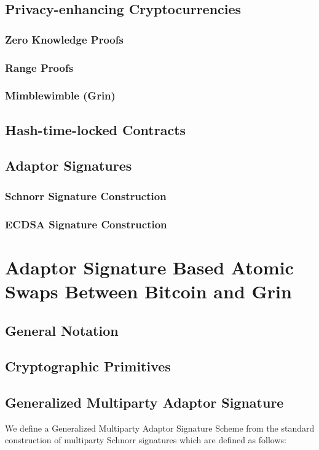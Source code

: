 \documentclass[draft,final]{vutinfth} %
\begin{document}
\section{Privacy-enhancing Cryptocurrencies}
\subsection{Zero Knowledge Proofs}
\subsection{Range Proofs}
\subsection{Mimblewimble (Grin)}
\section{Hash-time-locked Contracts}
\section{Adaptor Signatures}
\subsection{Schnorr Signature Construction}
\subsection{ECDSA Signature Construction}

\chapter{Adaptor Signature Based Atomic Swaps Between Bitcoin and Grin}
\section{General Notation}
\section{Cryptographic Primitives}
\section{Generalized Multiparty Adaptor Signature}
We define a Generalized Multiparty Adaptor Signature Scheme from the standard construction of multiparty Schnorr signatures which
are defined as follows:\\
\end{document}
